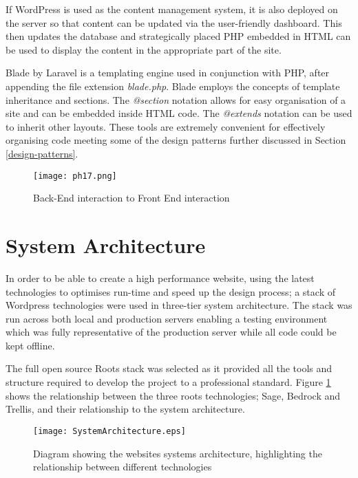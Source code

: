 \documentclass[fontsize=11pt]{extarticle}
\numberwithin{figure}{section} %
\numberwithin{table}{section}%
\begin{document}
If WordPress is used as the content management system, it is also
deployed on the server so that content can be updated via the
user-friendly dashboard. This then updates the database and
strategically placed PHP embedded in HTML can be used to display the
content in the appropriate part of the site.

Blade by Laravel is a templating engine used in conjunction with PHP,
after appending the file extension \emph{blade.php}. Blade employs the
concepts of template inheritance and sections. The \emph{@section}
notation allows for easy organisation of a site and can be embedded
inside HTML code. The \emph{@extends} notation can be used to inherit
other layouts. These tools are extremely convenient for effectively
organising code \cite{p18} meeting some of the design patterns further
discussed in Section \ref{design-patterns}.

\begin{figure}[H]
      \centering
      \texttt{[image: ph17.png]}
      \caption{Back-End interaction to Front End interaction}
 \end{figure}

\newpage

\hypertarget{system-architecture}{%
\section{System Architecture}\label{system-architecture}}

In order to be able to create a high performance website, using the
latest technologies to optimises run-time and speed up the design
process; a stack of Wordpress technologies were used in three-tier
system architecture. The stack was run across both local and production
servers enabling a testing environment which was fully representative of
the production server while all code could be kept offline.

The full open source Roots stack \cite{rootsweb} was selected as it
provided all the tools and structure required to develop the project to
a professional standard. Figure \ref{systemarchitecture} shows the
relationship between the three roots technologies; Sage, Bedrock and
Trellis, and their relationship to the system architecture.

\begin{figure}[H]
\centering
\texttt{[image: SystemArchitecture.eps]}
\caption{Diagram showing the websites systems architecture, highlighting the relationship between different technologies}
\label{systemarchitecture}
\end{figure}
\end{document}
